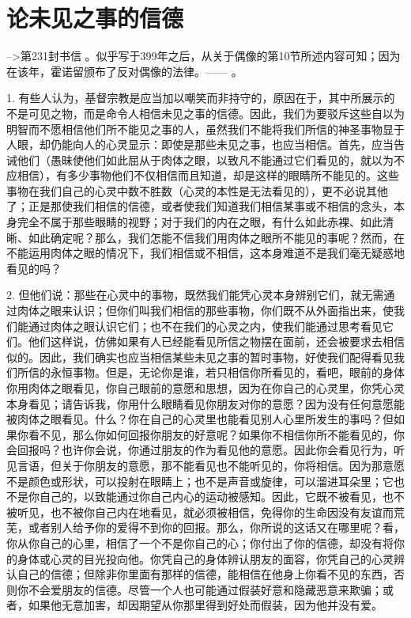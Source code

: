 
\chapter{论未见之事的信德}


 -->第231封书信 。似乎写于399年之后，从关于偶像的第10节所述内容可知；因为在该年，霍诺留颁布了反对偶像的法律。—— 。\par

1. 有些人认为，基督宗教是应当加以嘲笑而非持守的，原因在于，其中所展示的不是可见之物，而是命令人相信未见之事的信德。因此，我们为要驳斥这些自以为明智而不愿相信他们所不能见之事的人，虽然我们不能将我们所信的神圣事物显于人眼，却仍能向人的心灵显示：即使是那些未见之事，也应当相信。首先，应当告诫他们（愚昧使他们如此屈从于肉体之眼，以致凡不能通过它们看见的，就以为不应相信），有多少事物他们不仅相信而且知道，却是这样的眼睛所不能见的。这些事物在我们自己的心灵中数不胜数（心灵的本性是无法看见的），更不必说其他了；正是那使我们相信的信德，或者使我们知道我们相信某事或不相信的念头，本身完全不属于那些眼睛的视野；对于我们的内在之眼，有什么如此赤裸、如此清晰、如此确定呢？那么，我们怎能不信我们用肉体之眼所不能见的事呢？然而，在不能运用肉体之眼的情况下，我们相信或不相信，这本身难道不是我们毫无疑惑地看见的吗？\par

2. 但他们说：那些在心灵中的事物，既然我们能凭心灵本身辨别它们，就无需通过肉体之眼来认识；但你们叫我们相信的那些事物，你们既不从外面指出来，使我们能通过肉体之眼认识它们；也不在我们的心灵之内，使我们能通过思考看见它们。他们这样说，仿佛如果有人已经能看见所信之物摆在面前，还会被要求去相信似的。因此，我们确实也应当相信某些未见之事的暂时事物，好使我们配得看见我们所信的永恒事物。但是，无论你是谁，若只相信你所看见的，看吧，眼前的身体你用肉体之眼看见，你自己眼前的意愿和思想，因为在你自己的心灵里，你凭心灵本身看见；请告诉我，你用什么眼睛看见你朋友对你的意愿？因为没有任何意愿能被肉体之眼看见。什么？你在自己的心灵里也能看见别人心里所发生的事吗？但如果你看不见，那么你如何回报你朋友的好意呢？如果你不相信你所不能看见的，你会回报吗？也许你会说，你通过朋友的作为看见他的意愿。因此你会看见行为，听见言语，但关于你朋友的意愿，那不能看见也不能听见的，你将相信。因为那意愿不是颜色或形状，可以投射在眼睛上；也不是声音或旋律，可以溜进耳朵里；它也不是你自己的，以致能通过你自己内心的运动被感知。因此，它既不被看见，也不被听见，也不被你自己内在地看见，就必须被相信，免得你的生命因没有友谊而荒芜，或者别人给予你的爱得不到你的回报。那么，你所说的这话又在哪里呢？看，你从你自己的心里，相信了一个不是你自己的心；你付出了你的信德，却没有将你的身体或心灵的目光投向他。你凭自己的身体辨认朋友的面容，你凭自己的心灵辨认自己的信德；但除非你里面有那样的信德，能相信在他身上你看不见的东西，否则你不会爱朋友的信德。尽管一个人也可能通过假装好意和隐藏恶意来欺骗；或者，如果他无意加害，却因期望从你那里得到好处而假装，因为他并没有爱。\par

